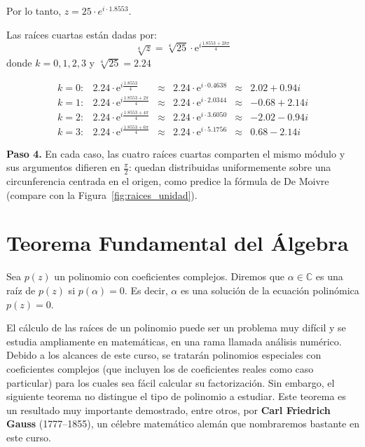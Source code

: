 \begin{example}
\begin{myproof}
\begin{enumerate}[$a)$]
   Por lo tanto, $z = 25\cdot e^{i\cdot 1.8553}$.

   Las raíces cuartas están dadas por:
   $$\boxed{\sqrt[4]{z} = \sqrt[4]{25}\cdot \mathrm{e}^{i\frac{1.8553+2k\pi}{4}}}$$
   donde $k=0,1,2,3$ y $\sqrt[4]{25} = 2.24$

   $$\begin{matrix}
   k=0: & 2.24\cdot\mathrm{e}^{i\frac{1.8553}{4}} &\approx& 2.24\cdot\mathrm{e}^{i\cdot 0.4638} &\approx& 2.02+0.94i \\
   k=1: & 2.24\cdot\mathrm{e}^{i\frac{1.8553+2\pi}{4}} &\approx& 2.24\cdot\mathrm{e}^{i\cdot 2.0344} &\approx& -0.68+2.14i \\
   k=2: & 2.24\cdot\mathrm{e}^{i\frac{1.8553+4\pi}{4}} &\approx& 2.24\cdot\mathrm{e}^{i\cdot 3.6050} &\approx& -2.02-0.94i \\
   k=3: & 2.24\cdot\mathrm{e}^{i\frac{1.8553+6\pi}{4}} &\approx& 2.24\cdot\mathrm{e}^{i\cdot 5.1756} &\approx& 0.68-2.14i
   \end{matrix}$$
\end{enumerate}

\textbf{Paso 4.} En cada caso, las cuatro raíces cuartas comparten el mismo módulo y sus argumentos difieren en $\frac{\pi}{2}$: quedan distribuidas uniformemente sobre una circunferencia centrada en el origen, como predice la fórmula de De Moivre (compare con la Figura~\ref{fig:raices_unidad}).
\end{myproof}
\end{example}

\section{Teorema Fundamental del Álgebra}

\begin{definition}
Sea $p(z)$ un polinomio con coeficientes complejos. Diremos que $\alpha \in \mathbb{C}$ es una raíz de $p(z)$ si $p(\alpha)=0$. Es decir, $\alpha$ es una solución de la ecuación polinómica $p(z)=0$.
\end{definition}

El cálculo de las raíces de un polinomio puede ser un problema muy difícil y se estudia ampliamente en matemáticas, en una rama llamada análisis numérico. Debido a los alcances de este curso, se tratarán polinomios especiales con coeficientes complejos (que incluyen los de coeficientes reales como caso particular) para los cuales sea fácil calcular su factorización. Sin embargo, el siguiente teorema no distingue el tipo de polinomio a estudiar. Este teorema es un resultado muy importante demostrado, entre otros, por \textbf{Carl Friedrich Gauss} (1777--1855), un célebre matemático alemán que nombraremos bastante en este curso.

